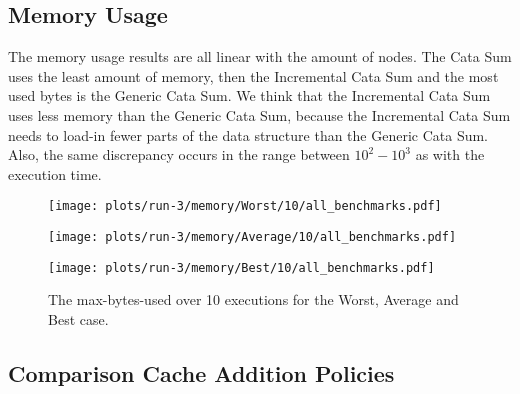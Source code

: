 \newpage
\subsection{Memory Usage}

The memory usage results are all linear with the amount of nodes. The Cata Sum uses the least amount of memory, then the Incremental Cata Sum and the most used bytes is the Generic Cata Sum. We think that the Incremental Cata Sum uses less memory than the Generic Cata Sum, because the Incremental Cata Sum needs to load-in fewer parts of the data structure than the Generic Cata Sum. Also, the same discrepancy occurs in the range between $10^2 - 10^3$ as with the execution time.

\begin{figure}[H]
  \begin{minipage}{.5\textwidth}
    \centering
    \texttt{[image: plots/run-3/memory/Worst/10/all\_benchmarks.pdf]}  
  \end{minipage}
  \begin{minipage}{.5\textwidth}
    \centering
    \texttt{[image: plots/run-3/memory/Average/10/all\_benchmarks.pdf]}  
  \end{minipage}
  \begin{center}
    \begin{minipage}[c]{.5\textwidth}
      \centering
      \texttt{[image: plots/run-3/memory/Best/10/all\_benchmarks.pdf]}  
    \end{minipage}
  \end{center}
  \caption{The max-bytes-used over 10 executions for the Worst, Average and Best case.}
\end{figure}

\newpage
\subsection{Comparison Cache Addition Policies}

